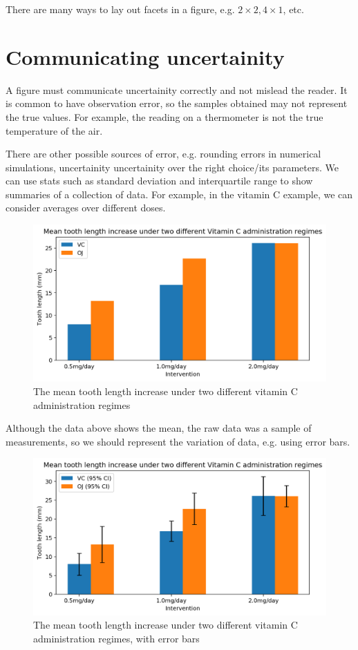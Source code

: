 \documentclass[a4paper, openany]{memoir}
\begin{document}
There are many ways to lay out facets in a figure, e.g. $2 \times 2, 4 \times 1$, etc.

\section{Communicating uncertainity}
A figure must communicate uncertainity correctly and not mislead the reader. It is common to have observation error, so the samples obtained may not represent the true values. For example, the reading on a thermometer is not the true temperature of the air.

There are other possible sources of error, e.g. rounding errors in numerical simulations, uncertainity uncertainity over the right choice/its parameters. We can use stats such as standard deviation and interquartile range to show summaries of a collection of data. For example, in the vitamin C example, we can consider averages over different doses.
\begin{figure}[H]
    \centering
    \includegraphics[scale=0.6]{src/2.63 tooth length example I.png}
    \caption{The mean tooth length increase under two different vitamin C administration regimes}
\end{figure}
\noindent Although the data above shows the mean, the raw data was a sample of measurements, so we should represent the variation of data, e.g. using error bars.
\begin{figure}[H]
    \centering
    \includegraphics[scale=0.6]{src/2.64 tooth length example II.png}
    \caption{The mean tooth length increase under two different vitamin C administration regimes, with error bars}
\end{figure}
\end{document}
